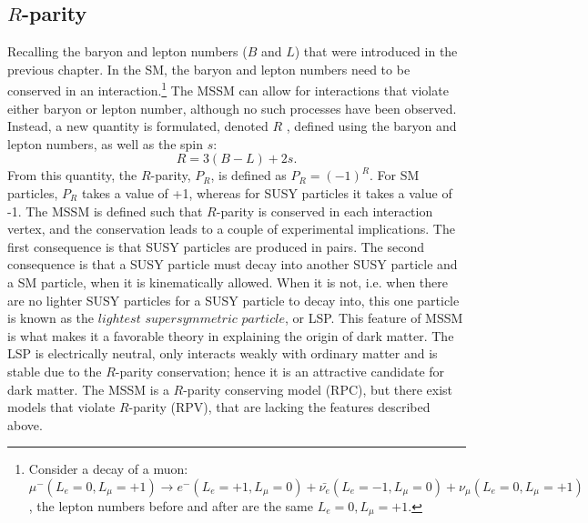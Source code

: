 \subsection*{$R$-parity}
\noindent\justify
Recalling the baryon and lepton numbers ($B$ and $L$) that were introduced in the previous chapter. 
In the SM, the baryon and lepton numbers need to be conserved in an interaction.\footnote{Consider a decay of a muon: $\mu^{-} (L_{e}=0, L_{\mu}=+1)\rightarrow e^{-} (L_{e}=+1, L_{\mu}=0) +\bar{\nu_{e}} (L_{e}=-1,L_{\mu}=0)+\nu_{\mu} (L_{e}=0,L_{\mu}=+1)$, the lepton numbers before and after are the same $L_{e}=0, L_{\mu}=+1$.}  
The MSSM can allow for interactions that violate either baryon or lepton number, although no such processes have been observed. 
Instead, a new quantity is formulated, denoted $R$ \cite{Farrar:1978xj}, defined using the baryon and lepton numbers, as well as the spin $s$:
\begin{equation}
R={3(B-L)+2s}.
\end{equation}
From this quantity, the $R$-parity, $P_{R}$, is defined as $P_{R}=(-1)^{R}$.
For SM particles, $P_{R}$ takes a value of +1, whereas for SUSY particles it takes a value of -1. 
The MSSM is defined such that $R$-parity is conserved in each interaction vertex, and the conservation leads to a couple of experimental implications. 
The first consequence is that SUSY particles are produced in pairs. 
The second consequence is that a SUSY particle must decay into another SUSY particle and a SM particle, when it is kinematically allowed. 
When it is not, i.e. when there are no lighter SUSY particles for a SUSY particle to decay into, this one particle is known as the $lightest$ $supersymmetric$ $particle$, or LSP. 
This feature of MSSM is what makes it a favorable theory in explaining the origin of dark matter. 
The LSP is electrically neutral, only interacts weakly with ordinary matter and is stable due to the $R$-parity conservation; hence it is an attractive candidate for dark matter.
The MSSM is a $R$-parity conserving model (RPC), but there exist models that violate $R$-parity (RPV), that are lacking the features described above.
